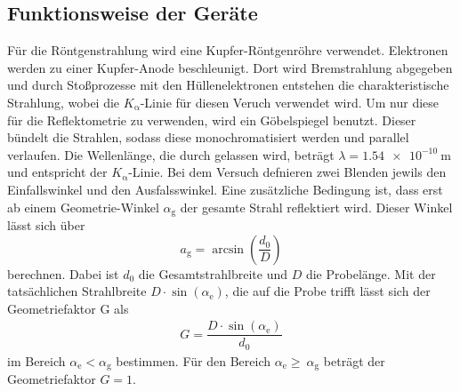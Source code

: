 \subsection{Funktionsweise der Geräte}
\label{sec:Geräte}
Für die Röntgenstrahlung wird eine Kupfer-Röntgenröhre verwendet. Elektronen werden zu einer Kupfer-Anode beschleunigt. Dort wird Bremstrahlung abgegeben und durch Stoßprozesse mit den Hüllenelektronen entstehen die charakteristische Strahlung, wobei die $K_\mathrm{\alpha}$-Linie für diesen Veruch verwendet wird. Um nur diese für die Reflektometrie zu verwenden, wird ein Göbelspiegel benutzt. Dieser bündelt die Strahlen, sodass diese monochromatisiert werden und parallel verlaufen. Die Wellenlänge, die durch gelassen wird, beträgt $\lambda=\SI{1.54 e-10}{\meter}$ und entspricht der $K_\mathrm{\alpha}$-Linie.
Bei dem Versuch defnieren zwei Blenden jewils den Einfallswinkel und den Ausfalsswinkel. Eine zusätzliche Bedingung ist, dass erst ab einem Geometrie-Winkel $\alpha_\mathrm{g}$ der gesamte Strahl reflektiert wird. Dieser Winkel lässt sich über
\begin{equation}
  \label{eqn:Geometriewinkel}
a_\mathrm{g}=\arcsin\left(\dfrac{d_\mathrm{0}}{D}\right)
\end{equation}
berechnen. Dabei ist $d_\mathrm{0}$ die Gesamtstrahlbreite und $D$ die Probelänge. Mit der tatsächlichen Strahlbreite $D\cdot\sin(\alpha_\mathrm{e})$, die auf die Probe trifft lässt sich der Geometriefaktor G als
\begin{align}
  \label{eqn:Geometriefaktorl}
G= \dfrac{D\cdot\sin(\alpha_\mathrm{e})}{d_\mathrm{0}}
\end{align}
im Bereich $ \alpha_\mathrm{e}< \alpha_\mathrm{g}$ bestimmen. Für den Bereich $\alpha_\mathrm{e}\geq\ \alpha_\mathrm{g}$ beträgt der Geometriefaktor $G=1$.
